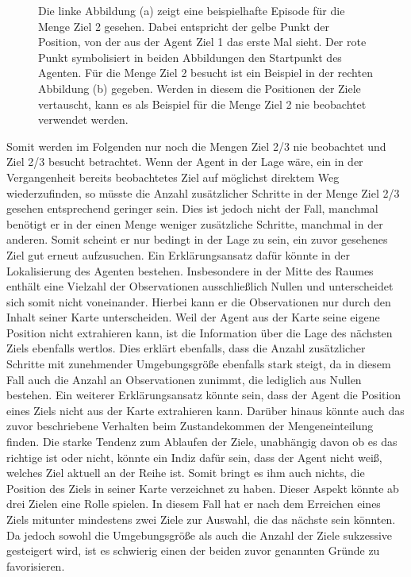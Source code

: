\begin{figure}[ht!]
\begin{subfigure}[c]{0.5\textwidth}
		\subcaption{}
		\label{sample_visited}
	\end{subfigure}
	\caption{Die linke Abbildung (a) zeigt eine beispielhafte Episode für die Menge \glqq Ziel 2 gesehen\grqq{}. Dabei entspricht der gelbe Punkt der Position, von der aus der Agent Ziel 1 das erste Mal sieht. Der rote Punkt symbolisiert in beiden Abbildungen den Startpunkt des Agenten. Für die Menge \glqq Ziel 2 besucht\grqq{} ist ein Beispiel in der rechten Abbildung (b) gegeben. Werden in diesem die Positionen der Ziele vertauscht, kann es als Beispiel für die Menge \glqq Ziel 2 nie beobachtet\grqq{} verwendet werden.}
\end{figure}

Somit werden im Folgenden nur noch die Mengen \glqq Ziel 2/3 nie beobachtet\grqq{} und \glqq Ziel 2/3 besucht\grqq{} betrachtet. Wenn der Agent in der Lage wäre, ein in der Vergangenheit bereits beobachtetes Ziel auf möglichst direktem Weg wiederzufinden, so müsste die Anzahl zusätzlicher Schritte in der Menge \glqq Ziel 2/3 gesehen\grqq{} entsprechend geringer sein. Dies ist jedoch nicht der Fall, manchmal benötigt er in der einen Menge weniger zusätzliche Schritte, manchmal in der anderen. Somit scheint er nur bedingt in der Lage zu sein, ein zuvor gesehenes Ziel gut erneut aufzusuchen. Ein Erklärungsansatz dafür könnte in der Lokalisierung des Agenten bestehen. Insbesondere in der Mitte des Raumes enthält eine Vielzahl der Observationen ausschließlich Nullen und unterscheidet sich somit nicht voneinander. Hierbei kann er die Observationen nur durch den Inhalt seiner Karte unterscheiden. Weil der Agent aus der Karte seine eigene Position nicht extrahieren kann, ist die Information über die Lage des nächsten Ziels ebenfalls wertlos. Dies erklärt ebenfalls, dass die Anzahl zusätzlicher Schritte mit zunehmender Umgebungsgröße ebenfalls stark steigt, da in diesem Fall auch die Anzahl an Observationen zunimmt, die lediglich aus Nullen bestehen. Ein weiterer Erklärungsansatz könnte sein, dass der Agent die Position eines Ziels nicht aus der Karte extrahieren kann. Darüber hinaus könnte auch das zuvor beschriebene Verhalten beim Zustandekommen der Mengeneinteilung finden. Die starke Tendenz zum Ablaufen der Ziele, unabhängig davon ob es das richtige ist oder nicht, könnte ein Indiz dafür sein, dass der Agent nicht weiß, welches Ziel aktuell an der Reihe ist. Somit bringt es ihm auch nichts, die Position des Ziels in seiner Karte verzeichnet zu haben. Dieser Aspekt könnte ab drei Zielen eine Rolle spielen. In diesem Fall hat er nach dem Erreichen eines Ziels mitunter mindestens zwei Ziele zur Auswahl, die das nächste sein könnten. Da jedoch sowohl die Umgebungsgröße als auch die Anzahl der Ziele sukzessive gesteigert wird, ist es schwierig einen der beiden zuvor genannten Gründe zu favorisieren.

